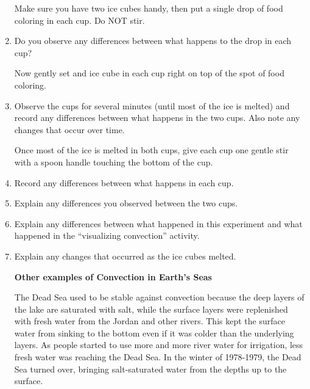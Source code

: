 \documentclass[letterpaper,11pt]{article}
\begin{document}
\begin{enumerate}
Make sure you have two ice cubes handy, then put a single drop of food coloring in each cup.  Do NOT stir. 
\item Do you observe any differences between what happens to the drop in each cup?

\vspace{.1in}

Now gently set and ice cube in each cup right on top of the spot of food coloring.  
\item Observe the cups for several minutes (until most of the ice is melted) and record any differences between what happens in the two cups.  Also note any changes that occur over time.

Once most of the ice is melted in both cups, give each cup one gentle stir with a spoon handle touching the bottom of the cup.
\vspace{.1in}
\item Record any differences between what happens in each cup.

\item Explain any differences you observed between the two cups.
\item Explain any differences between what happened in this experiment and what happened in the ``visualizing convection'' activity.
\item Explain any changes that occurred as the ice cubes melted.

\vspace{.1in}
\textbf{Other examples of Convection in Earth's Seas}
\vspace{.1in}

The Dead Sea used to be stable against convection because the deep layers of the lake are saturated with salt, while the surface layers were replenished with fresh water from the Jordan and other rivers.  This kept the surface water from sinking to the bottom even if it was colder than the underlying layers. As people started to use more and more river water for irrigation, less fresh water was reaching the Dead Sea.  In the winter of 1978-1979, the Dead Sea turned over, bringing salt-saturated water from the depths up to the surface.  




\end{enumerate}
\end{document}
